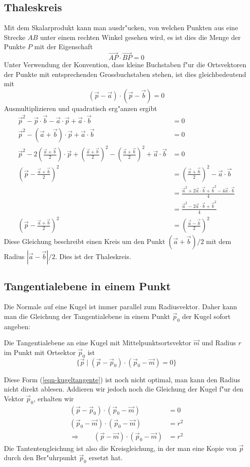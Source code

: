 \subsection{Thaleskreis}
Mit dem Skalarprodukt kann man ausdr"ucken, von welchen Punkten aus
eine Strecke $AB$ unter einem rechten Winkel gesehen wird, es ist
dies die Menge der Punkte $P$ mit der Eigenschaft
\[
\overrightarrow{AP}\cdot\overrightarrow{BP}=0
\]
Unter Verwendung der Konvention, dass kleine Buchstaben f"ur die
Ortsvektoren der Punkte mit entsprechenden Grossbuchstaben stehen, ist
dies gleichbedeutend mit
\[
(\vec p-\vec a)\cdot(\vec p-\vec b)=0
\]
Ausmultiplizieren und quadratisch erg"anzen ergibt
\begin{align*}
\vec p^2-\vec p\cdot\vec b-\vec a\cdot\vec p+\vec a\cdot\vec b&=0
\\
\vec p^2-(\vec a+\vec b)\cdot \vec p+\vec a\cdot\vec b&=0
\\
\vec p^2-2\left(\frac{\vec a+\vec b}{2}\right)\cdot \vec p
+\left(\frac{\vec a+\vec b}{2}\right)^2
-\left(\frac{\vec a+\vec b}{2}\right)^2
+\vec a\cdot\vec b&=0
\\
\left(\vec p
-\frac{\vec a+\vec b}{2}\right)^2&=
\left(\frac{\vec a+\vec b}{2}\right)^2-\vec a\cdot \vec b
\\
&=
\frac{\vec a^2+2\vec a\cdot\vec b+\vec b^2-4\vec a\cdot \vec b}{4}
\\
&=
\frac{\vec a^2-2\vec a\cdot\vec b+\vec b^2}{4}
\\
\left(\vec p
-\frac{\vec a+\vec b}{2}\right)^2&=
\left(\frac{\vec a-\vec b}{2}\right)^2
\end{align*}
Diese Gleichung beschreibt einen Kreis um den Punkt $(\vec a+\vec b)/2$
mit dem Radius $|\vec a-\vec b|/2$.
Dies ist der Thaleskreis.

\subsection{Tangentialebene in einem Punkt}
Die Normale auf eine Kugel ist immer parallel zum Radiusvektor.
Daher kann
man die Gleichung der Tangentialebene in einem Punkt $\vec p_0$ der Kugel
sofort angeben:
\begin{satz}\label{kugeltangentialebene}
Die Tangentialebene an eine Kugel mit Mittelpunktsortsvektor
$\vec m$ und Radius  $r$ im Punkt mit Ortsektor $\vec p_0$ ist
\begin{equation}
\{\vec p\;|\;
(\vec p-\vec p_0)\cdot(\vec p_0-\vec m)=0
\}
\label{eqn-kugeltangente}
\end{equation}
\end{satz}
Diese Form (\ref{eqn-kugeltangente}) ist noch nicht optimal, man kann den
Radius nicht direkt ablesen.
Addieren wir jedoch noch die Gleichung
der Kugel f"ur den Vektor $\vec p_0$, erhalten wir
\begin{align*}
(\vec p-\vec p_0)\cdot(\vec p_0-\vec m)&=0\\
(\vec p_0-\vec m)\cdot(\vec p_0-\vec m)&=r^2\\
\Rightarrow\qquad
(\vec p-\vec m)\cdot(\vec p_0-\vec m)&=r^2
\end{align*}
Die Tantentengleichung ist also die Kreisgleichung, in der man
eine Kopie von $\vec p$ durch den Ber"uhrpunkt $\vec p_0$ ersetzt
hat.


